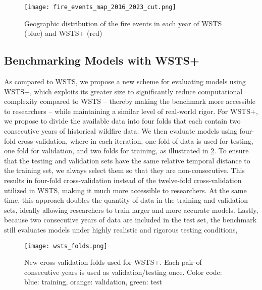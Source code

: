\begin{figure}
    \centering
    \texttt{[image: fire\_events\_map\_2016\_2023\_cut.png]}
    \caption{Geographic distribution of the fire events in each year of WSTS (blue) and WSTS+ (red)}
    \label{fig:wsts+map}
\end{figure}

\subsection{Benchmarking Models with WSTS+}
As compared to WSTS, we propose a new scheme for evaluating models using WSTS+, which exploits its greater size to significantly reduce computational complexity compared to WSTS -- thereby making the benchmark more accessible to researchers -- while maintaining a similar level of real-world rigor.  For WSTS+, we propose to divide the available data into four folds that each contain two consecutive years of historical wildfire data.  We then evaluate models using four-fold cross-validation, where in each iteration, one fold of data is used for testing, one fold for validation, and two folds for training, as illustrated in \cref{fig:wsts+folds}. To ensure that the testing and validation sets have the same relative temporal distance to the training set, we always select them so that they are non-consecutive.  This results in four-fold cross-validation instead of the twelve-fold cross-validation utilized in WSTS, making it much more accessible to researchers. At the same time, this approach doubles the quantity of data in the training and validation sets, ideally allowing researchers to train larger and more accurate models. Lastly, because two consecutive years of data are included in the test set, the benchmark still evaluates models under highly realistic and rigorous testing conditions, 

\begin{figure}
    \centering
    \texttt{[image: wsts\_folds.png]}
    \caption{New cross-validation folds used for WSTS+. Each pair of consecutive years is used as validation/testing once. Color code: blue: training, orange: validation, green: test}
    \label{fig:wsts+folds}
\end{figure}


